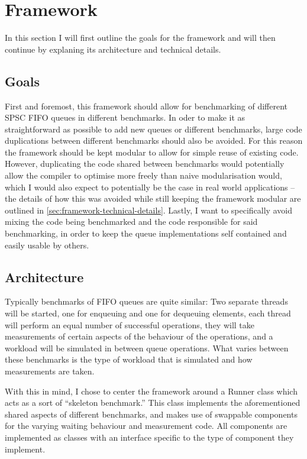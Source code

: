 \section{Framework}
\label{sec:framework}
In this section I will first outline the goals for the framework and will then continue by explaning its architecture and technical details.

\subsection{Goals}
First and foremost, this framework should allow for benchmarking of different SPSC FIFO queues in different benchmarks.
In oder to make it as straightforward as possible to add new queues or different benchmarks, large code
duplications between different benchmarks should also be avoided.
For this reason the framework should be kept modular to allow for simple reuse of existing code.
However, duplicating the code shared between benchmarks would potentially allow the compiler to optimise more
freely than naive modularisation would, which I would also expect to potentially be the case in real world
applications -- the details of how this was avoided while still keeping the framework modular are outlined in
\autoref{sec:framework-technical-details}.
Lastly, I want to specifically avoid mixing the code being benchmarked and the code responsible for said
benchmarking, in order to keep the queue implementations self contained and easily usable by others.

\subsection{Architecture}
Typically benchmarks of FIFO queues are quite similar\cite{EQueue,B-Queue,MCRingBuffer}:
Two separate threads will be started, one for enqueuing and one for dequeuing elements,
each thread will perform an equal number of successful operations,
they will take measurements of certain aspects of the behaviour of the operations,
and a workload will be simulated in between queue operations.
What varies between these benchmarks is the type of workload that is simulated and how measurements are taken.

With this in mind, I chose to center the framework around a Runner class which acts as a sort of ``skeleton benchmark.''
This class implements the aforementioned shared aspects of different benchmarks, and makes use of swappable
components for the varying waiting behaviour and measurement code.
All components are implemented as classes with an interface specific to the type of component they implement.

